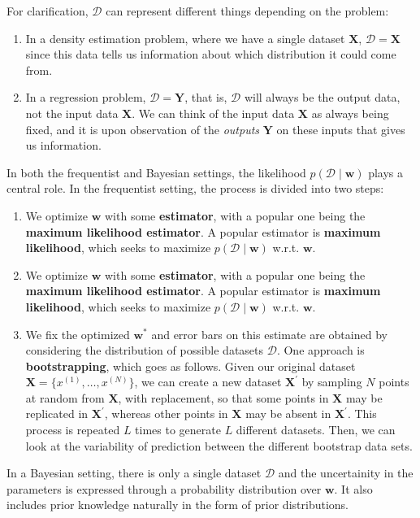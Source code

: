 For clarification, $\mathcal{D}$ can represent different things depending on the problem: 
\begin{enumerate}
  \item In a density estimation problem, where we have a single dataset $\mathbf{X}$, $\mathcal{D} = \mathbf{X}$ since this data tells us information about which distribution it could come from. 

  \item In a regression problem, $\mathcal{D} = \mathbf{Y}$, that is, $\mathcal{D}$ will always be the output data, not the input data $\mathbf{X}$. We can think of the input data $\mathbf{X}$ as always being fixed, and it is upon observation of the \textit{outputs} $\mathbf{Y}$ on these inputs that gives us information. 
\end{enumerate}
In both the frequentist and Bayesian settings, the likelihood $p(\mathcal{D} \mid \mathbf{w})$ plays a central role. In the frequentist setting, the process is divided into two steps: 
\begin{enumerate}
  \item We optimize $\mathbf{w}$ with some \textbf{estimator}, with a popular one being the \textbf{maximum likelihood estimator}. A popular estimator is \textbf{maximum likelihood}, which seeks to maximize $p(\mathcal{D} \mid \mathbf{w})$ w.r.t. $\mathbf{w}$. 
  \item We optimize $\mathbf{w}$ with some \textbf{estimator}, with a popular one being the \textbf{maximum likelihood estimator}. A popular estimator is \textbf{maximum likelihood}, which seeks to maximize $p(\mathcal{D} \mid \mathbf{w})$ w.r.t. $\mathbf{w}$. 
  \item We fix the optimized $\mathbf{w}^\ast$ and error bars on this estimate are obtained by considering the distribution of possible datasets $\mathcal{D}$. One approach is \textbf{bootstrapping}, which goes as follows. Given our original dataset $\mathbf{X} = \{x^{(1)}, \ldots, x^{(N)}\}$, we can create a new dataset $\mathbf{X}^\prime$ by sampling $N$ points at random from $\mathbf{X}$, with replacement, so that some points in $\mathbf{X}$ may be replicated in $\mathbf{X}^\prime$, whereas other points in $\mathbf{X}$ may be absent in $\mathbf{X}^\prime$. This process is repeated $L$ times to generate $L$ different datasets. Then, we can look at the variability of prediction between the different bootstrap data sets. 
\end{enumerate}
In a Bayesian setting, there is only a single dataset $\mathcal{D}$ and the uncertainity in the parameters is expressed through a probability distribution over $\mathbf{w}$. It also includes prior knowledge naturally in the form of prior distributions. 

